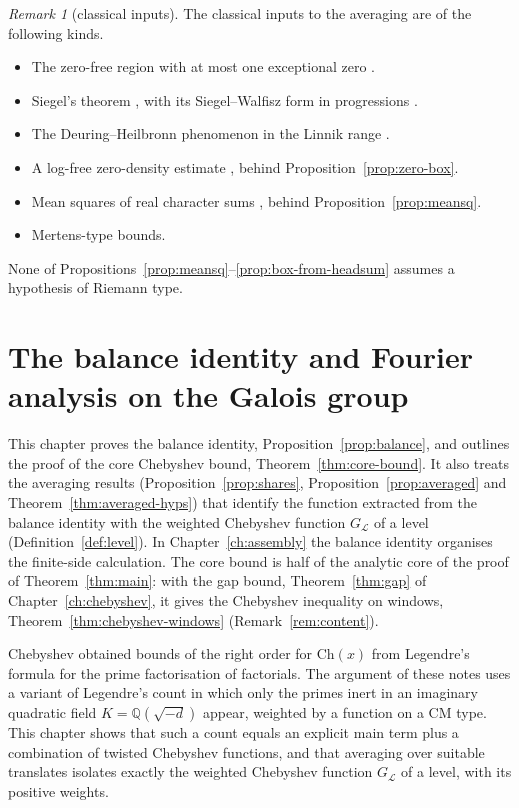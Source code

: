 \documentclass[11pt]{amsbook}
\theoremstyle{plain}
\theoremstyle{definition}
\theoremstyle{remark}
\newtheorem{remark}[theorem]{Remark}
\numberwithin{equation}{section}
\numberwithin{figure}{chapter}
\numberwithin{table}{chapter}
\newcommand{\Q}{\mathbb{Q}}
\newcommand{\Ch}{\mathrm{Ch}}
\newcommand{\lev}{\mathscr{L}}
\begin{document}
\begin{remark}[classical inputs]\label{rem:classical-inputs}
The classical inputs to the averaging are of the following kinds.
\begin{itemize}
\item The zero-free region with at most one exceptional zero
\cite{Page1935}.
\item Siegel's theorem \cite{Siegel1935}, with its Siegel--Walfisz
form in progressions \cite{Walfisz1936}.
\item The Deuring--Heilbronn phenomenon in the Linnik range
\cite{Linnik1944}.
\item A log-free zero-density estimate \cite{Gallagher1970}, behind
Proposition~\ref{prop:zero-box}.
\item Mean squares of real character sums
\cite{Montgomery1971,HeathBrown1995}, behind
Proposition~\ref{prop:meansq}.
\item Mertens-type bounds.
\end{itemize}
None of
Propositions~\ref{prop:meansq}--\ref{prop:box-from-headsum} assumes a
hypothesis of Riemann type.
\end{remark}
\clearpage
\clearpage
\chapter{The balance identity and Fourier analysis on the Galois group}
\label{ch:balance}\label{sec:balance}

This chapter proves the balance identity,
Proposition~\ref{prop:balance}, and outlines the proof of the core
Chebyshev bound, Theorem~\ref{thm:core-bound}. It also treats the
averaging results
(Proposition~\ref{prop:shares}, Proposition~\ref{prop:averaged} and
Theorem~\ref{thm:averaged-hyps}) that identify the function extracted
from the balance identity with the weighted Chebyshev function
$G_\lev$ of a level (Definition~\ref{def:level}). In
Chapter~\ref{ch:assembly} the balance identity organises the
finite-side calculation. The core bound is half of the analytic
core of the proof of Theorem~\ref{thm:main}: with the gap bound,
Theorem~\ref{thm:gap} of Chapter~\ref{ch:chebyshev}, it gives the
Chebyshev inequality on windows, Theorem~\ref{thm:chebyshev-windows}
(Remark~\ref{rem:content}).

Chebyshev obtained bounds of the right order for $\Ch(x)$ from
Legendre's formula for the prime factorisation of factorials. The
argument of these notes uses a variant of Legendre's count in which
only the primes inert in an imaginary quadratic field
$K=\Q(\sqrt{-d})$ appear, weighted by a function on a CM type. This
chapter shows that such a count equals an explicit main term plus a
combination of twisted Chebyshev functions, and that averaging over
suitable translates isolates exactly the weighted Chebyshev function
$G_\lev$ of a level, with its positive weights.
\end{document}
